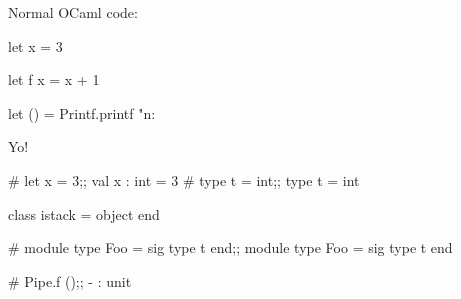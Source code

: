Normal OCaml code:

\begin{ocaml}
let x = 3

let f x = x + 1

let () = Printf.printf "n: %
\end{ocaml}

Yo!

\begin{ocaml}
# let x = 3;;
val x : int = 3
# type t = int;;
type t = int
\end{ocaml}

\begin{ocaml}
class istack = object end
\end{ocaml}

\begin{ocaml}
# module type Foo = sig type t end;;
module type Foo = sig type t end
\end{ocaml}


\begin{ocaml}
# Pipe.f ();;
- : unit
\end{ocaml}
